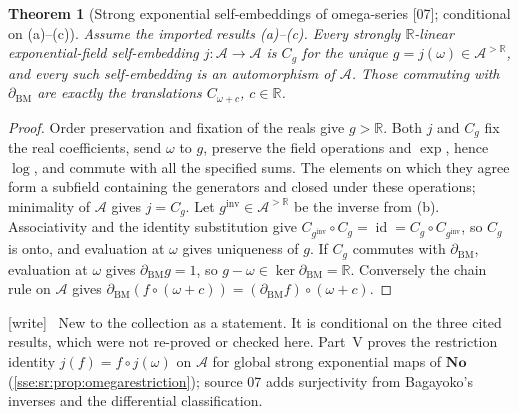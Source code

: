 \documentclass[11pt,a4paper]{article}
\numberwithin{equation}{section}
\theoremstyle{plain}
\newtheorem{theorem}{Theorem}[section]
\theoremstyle{definition}
\theoremstyle{remark}
\newcommand{\No}{\mathbf{No}}
\newcommand{\R}{\mathbb{R}}
\newcommand{\id}{\operatorname{id}}
\newcommand{\src}[1]{\textup{\textsf{\small[#1]}}}%
\newcommand{\wtag}{\textup{\textsf{[write]}}}%
\newenvironment{wnote}{\par\smallskip\noindent\wtag\ }{\par\smallskip}
\begin{document}
\begin{theorem}[Strong exponential self-embeddings of omega-series \src{07}; conditional on (a)--(c)]\label{sse:an:ana:omega-series-classification}
Assume the imported results (a)--(c). Every strongly $\R$-linear
exponential-field self-embedding $j:\mathcal A\to\mathcal A$ is $C_g$ for the
unique $g=j(\omega)\in\mathcal A^{>\R}$, and every such self-embedding is an
automorphism of $\mathcal A$. Those commuting with $\partial_{\mathrm{BM}}$ are
exactly the translations $C_{\omega+c}$, $c\in\R$.
\end{theorem}
\begin{proof}
Order preservation and fixation of the reals give $g>\R$. Both $j$ and $C_g$
fix the real coefficients, send $\omega$ to $g$, preserve the field
operations and $\exp$, hence $\log$, and commute with all the specified
sums. The elements on which they agree form a subfield containing the
generators and closed under these operations; minimality of $\mathcal A$
gives $j=C_g$. Let $g^{\mathrm{inv}}\in\mathcal A^{>\R}$ be the inverse from
(b). Associativity and the identity substitution give
$C_{g^{\mathrm{inv}}}\circ C_g=\id=C_g\circ C_{g^{\mathrm{inv}}}$, so $C_g$ is
onto, and evaluation at $\omega$ gives uniqueness of $g$. If $C_g$ commutes
with $\partial_{\mathrm{BM}}$, evaluation at $\omega$ gives
$\partial_{\mathrm{BM}}g=1$, so $g-\omega\in\ker\partial_{\mathrm{BM}}=\R$.
Conversely the chain rule on $\mathcal A$ gives
$\partial_{\mathrm{BM}}(f\circ(\omega+c))=(\partial_{\mathrm{BM}}f)\circ(\omega+c)$.
\end{proof}
\begin{wnote}
New to the collection as a statement. It is conditional on the three cited
results, which were not re-proved or checked here. Part~V proves the
restriction identity $j(f)=f\circ j(\omega)$ on $\mathcal A$ for global
strong exponential maps of $\No$ (\cref{sse:sr:prop:omegarestriction}); source 07
adds surjectivity from Bagayoko's inverses and the differential
classification.
\end{wnote}
\end{document}
